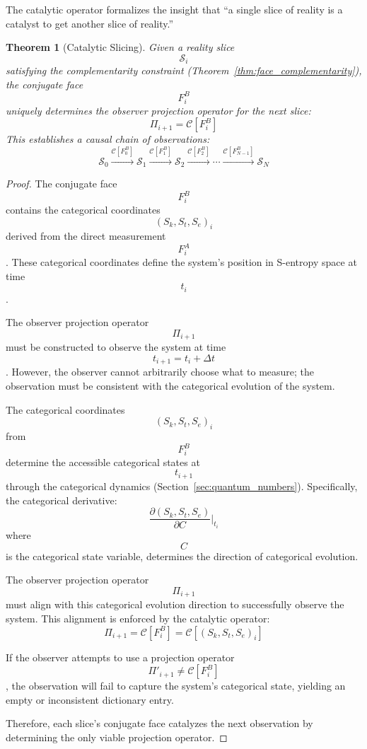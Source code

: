 \documentclass[11pt,twocolumn,a4paper]{article}
\newtheorem{theorem}{Theorem}[section]
\theoremstyle{remark}
\begin{document}
The catalytic operator formalizes the insight that ``a single slice of reality is a catalyst to get another slice of reality.''

\begin{theorem}[Catalytic Slicing]
\label{thm:catalytic_slicing}
Given a reality slice $$\mathcal{S}_i$$ satisfying the complementarity constraint (Theorem~\ref{thm:face_complementarity}), the conjugate face $$F_i^B$$ uniquely determines the observer projection operator for the next slice:
$$
\Pi_{i+1} = \mathcal{C}[F_i^B]
$$
This establishes a causal chain of observations:
$$
\mathcal{S}_0 \xrightarrow{\mathcal{C}[F_0^B]} \mathcal{S}_1 \xrightarrow{\mathcal{C}[F_1^B]} \mathcal{S}_2 \xrightarrow{\mathcal{C}[F_2^B]} \cdots \xrightarrow{\mathcal{C}[F_{N-1}^B]} \mathcal{S}_N
$$
\end{theorem}

\begin{proof}
The conjugate face $$F_i^B$$ contains the categorical coordinates $$(S_k, S_t, S_e)_i$$ derived from the direct measurement $$F_i^A$$. These categorical coordinates define the system's position in S-entropy space at time $$t_i$$.

The observer projection operator $$\Pi_{i+1}$$ must be constructed to observe the system at time $$t_{i+1} = t_i + \Delta t$$. However, the observer cannot arbitrarily choose what to measure; the observation must be consistent with the categorical evolution of the system.

The categorical coordinates $$(S_k, S_t, S_e)_i$$ from $$F_i^B$$ determine the accessible categorical states at $$t_{i+1}$$ through the categorical dynamics (Section~\ref{sec:quantum_numbers}). Specifically, the categorical derivative:
$$
\frac{\partial (S_k, S_t, S_e)}{\partial C} \bigg|_{t_i}
$$
where $$C$$ is the categorical state variable, determines the direction of categorical evolution.

The observer projection operator $$\Pi_{i+1}$$ must align with this categorical evolution direction to successfully observe the system. This alignment is enforced by the catalytic operator:
$$
\Pi_{i+1} = \mathcal{C}[F_i^B] = \mathcal{C}\left[(S_k, S_t, S_e)_i\right]
$$

If the observer attempts to use a projection operator $$\Pi'_{i+1} \neq \mathcal{C}[F_i^B]$$, the observation will fail to capture the system's categorical state, yielding an empty or inconsistent dictionary entry.

Therefore, each slice's conjugate face catalyzes the next observation by determining the only viable projection operator.
\end{proof}
\end{document}
